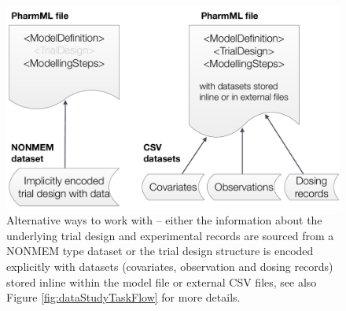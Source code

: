 \begin{figure}[htb!]
 \centering
  \includegraphics[width=0.5\textheight]{pics/DataVersusTrialDesign}
  \caption{Alternative ways to work with \pharmml -- either the information about the 
  underlying trial design and experimental records are sourced from a NONMEM type
  dataset or the trial design structure is encoded explicitly with datasets (covariates, 
  observation and dosing records) stored inline within the \pml model file or external 
  CSV files, see also Figure \ref{fig:dataStudyTaskFlow} for more details.}
  \label{fig:DataVersusTrialDesign}
\end{figure}

